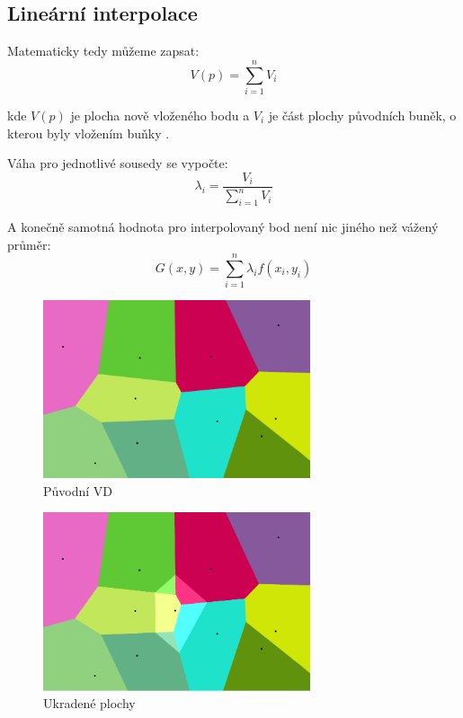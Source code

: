 \documentclass[12pt,a4paper]{article}
\begin{document}
{\subsection{Lineární interpolace}
\bigskip
Matematicky tedy můžeme zapsat:
\newline
$$V(p)=\sum_{i=1}^n V_i$$

\noindent kde $V(p)$ je plocha nově vloženého bodu a $V_i$ je část
plochy původních buněk, o kterou byly vložením buňky .

\bigskip
\noindent Váha pro jednotlivé sousedy se vypočte:
\newline
$$\lambda_i = \frac{V_i}{\sum_{i=1}^n V_i}$$

\bigskip
\noindent A konečně samotná hodnota pro interpolovaný bod není nic jiného než vážený průměr:
\newline
$$G(x,y) = \sum_{i=1}^{n} \lambda_i  f(x_i, y_i)$$

\newpage
\begin{figure}[h!]
\centering
\includegraphics[width=0.7\textwidth]{img/canvas_0.png}
\caption{Původní VD}
\label{fig:fig:canvas0}
\end{figure}

\begin{figure}[h!]
\centering
\includegraphics[width=0.7\textwidth]{img/canvas_1.png}
\caption{Ukradené plochy}
\label{fig:fig:canvas1}
\end{figure}

}
\end{document}
